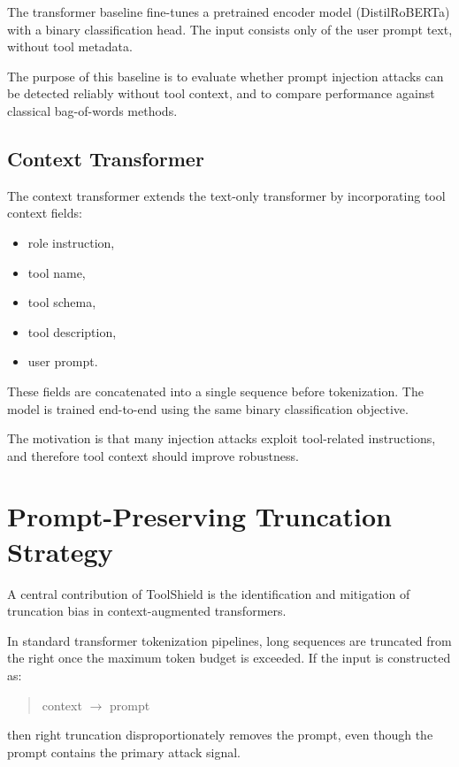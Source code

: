 The transformer baseline fine-tunes a pretrained encoder model (DistilRoBERTa) with a binary classification head. The input consists only of the user prompt text, without tool metadata.

The purpose of this baseline is to evaluate whether prompt injection attacks can be detected reliably without tool context, and to compare performance against classical bag-of-words methods.

\subsection{Context Transformer}
\label{subsec:context_transformer_model}

The context transformer extends the text-only transformer by incorporating tool context fields:

\begin{itemize}
    \item role instruction,
    \item tool name,
    \item tool schema,
    \item tool description,
    \item user prompt.
\end{itemize}

These fields are concatenated into a single sequence before tokenization. The model is trained end-to-end using the same binary classification objective.

The motivation is that many injection attacks exploit tool-related instructions, and therefore tool context should improve robustness.

\section{Prompt-Preserving Truncation Strategy}
\label{subsec:prompt_preserving_truncation}

A central contribution of ToolShield is the identification and mitigation of truncation bias in context-augmented transformers.

In standard transformer tokenization pipelines, long sequences are truncated from the right once the maximum token budget is exceeded. If the input is constructed as:

\begin{quote}
context $\rightarrow$ prompt
\end{quote}

then right truncation disproportionately removes the prompt, even though the prompt contains the primary attack signal.

